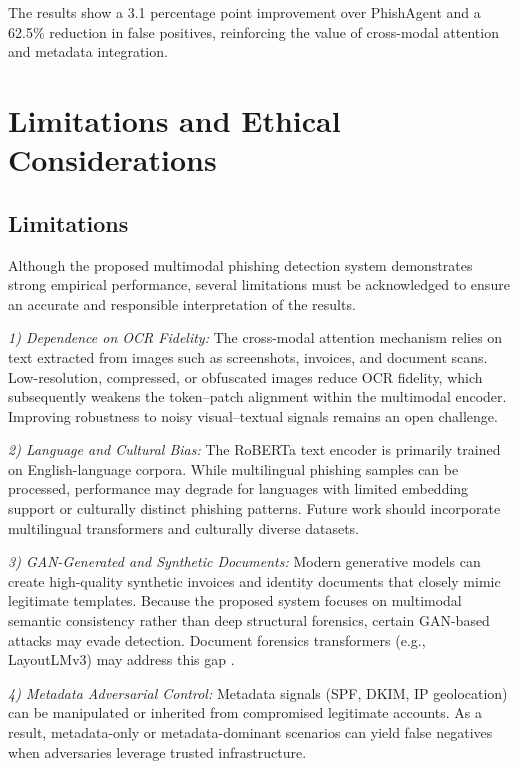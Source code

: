 \documentclass[conference]{IEEEtran}
\begin{document}
The results show a 3.1 percentage point improvement over PhishAgent and a 62.5\% reduction in false positives, reinforcing the value of cross-modal attention and metadata integration.

\section{Limitations and Ethical Considerations}

\subsection{Limitations}

Although the proposed multimodal phishing detection system demonstrates strong empirical performance, several limitations must be acknowledged to ensure an accurate and responsible interpretation of the results.

\textit{1) Dependence on OCR Fidelity:} The cross-modal attention mechanism relies on text extracted from images such as screenshots, invoices, and document scans. Low-resolution, compressed, or obfuscated images reduce OCR fidelity, which subsequently weakens the token--patch alignment within the multimodal encoder. Improving robustness to noisy visual--textual signals remains an open challenge.

\textit{2) Language and Cultural Bias:} The RoBERTa text encoder is primarily trained on English-language corpora. While multilingual phishing samples can be processed, performance may degrade for languages with limited embedding support or culturally distinct phishing patterns. Future work should incorporate multilingual transformers and culturally diverse datasets.

\textit{3) GAN-Generated and Synthetic Documents:} Modern generative models can create high-quality synthetic invoices and identity documents that closely mimic legitimate templates. Because the proposed system focuses on multimodal semantic consistency rather than deep structural forensics, certain GAN-based attacks may evade detection. Document forensics transformers (e.g., LayoutLMv3) may address this gap \cite{xu_2020_layoutlm}.

\textit{4) Metadata Adversarial Control:} Metadata signals (SPF, DKIM, IP geolocation) can be manipulated or inherited from compromised legitimate accounts. As a result, metadata-only or metadata-dominant scenarios can yield false negatives when adversaries leverage trusted infrastructure.
\end{document}
